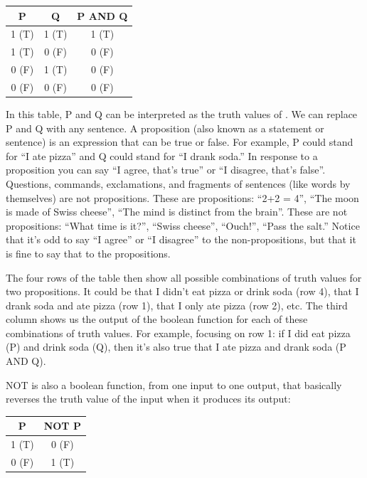 \begin{center}
\begin{tabular}{| c | c || c | }
\hline
  P  & Q & P AND Q  \\
\hline
  1 (T) & 1 (T) & 1 (T)  \\
\hline
 1 (T) & 0 (F) & 0 (F)  \\
\hline
 0 (F) & 1 (T) & 0 (F) \\
\hline
 0 (F) & 0 (F) & 0 (F) \\
\hline
\end{tabular}
\end{center}


In this table,  P and Q can be interpreted as the truth values of . We can replace P and Q with any sentence. A proposition (also known as a statement or sentence) is an expression that can be true or false. For example, P could stand for ``I ate pizza'' and Q could stand for ``I drank soda.''  In response to a proposition you can say ``I agree, that's true'' or ``I disagree, that's false''. Questions, commands, exclamations, and fragments of sentences (like words by themselves) are not propositions. These are propositions: ``2+2 = 4'', ``The moon is made of Swiss cheese'', ``The mind is distinct from the brain''.  These are not propositions: ``What time is it?'', ``Swiss cheese'', ``Ouch!'', ``Pass the salt.'' Notice that it's odd to say ``I agree'' or ``I disagree'' to the non-propositions, but that it is fine to say that to the propositions.

The four rows of the table then show all possible combinations of truth values for  two propositions. It could be that I didn't eat  pizza or drink soda (row 4), that I drank soda and ate pizza (row 1), that I only ate pizza (row 2), etc. The third column shows us the output of the boolean function for each of these combinations of truth values. For example, focusing on row 1: if I did eat pizza (P) and drink soda (Q), then it's also true that I ate pizza and drank soda (P AND Q).

NOT is also a boolean function, from one input to one output, that basically reverses the truth value of the input when it produces its output:

\begin{center}
\begin{tabular}{| c || c | }
\hline
  P  & NOT P  \\
\hline
  1 (T) & 0 (F)  \\
\hline
 0 (F) & 1 (T)  \\
\hline
\end{tabular}
\end{center}

